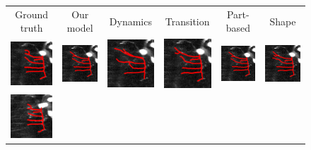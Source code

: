 \documentclass{article}
\begin{document}
\begin{figure}[t!]
	\hspace{-30pt}
	\begin{tabular}{cccccc} 
		\footnotesize{Ground truth} & \footnotesize{Our model} & \footnotesize{Dynamics} & \footnotesize{Transition} & \footnotesize{Part-based} & \footnotesize{Shape} \vspace{-2pt} \\
		{\includegraphics[width=2cm]{img/gt_t1.png}} &
		{\includegraphics[width=2cm]{img/all_t1.png}} &
		{\includegraphics[width=2cm]{img/dyna_t1.png}} &
		{\includegraphics[width=2cm]{img/tran_t1.png}} &  
		{\includegraphics[width=2cm]{img/repul_t1.png}} &  
		{\includegraphics[width=2cm]{img/shape_t1.png}}  \\
		{\includegraphics[width=2cm]{img/gt_t2.png}} &

\end{tabular}
\end{figure}
\end{document}
